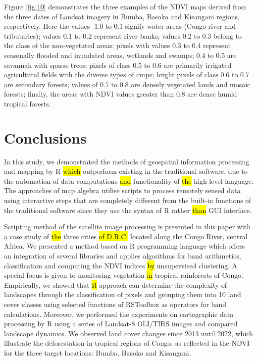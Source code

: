 \documentclass[applsci,article,submit,pdftex,moreauthors]{Definitions/mdpi}
\begin{document}
Figure \ref{fig:10} demonstrates the three examples of the NDVI maps derived from the three dates of Landsat imagery in Bumba, Basoko and Kisangani regions, respectively. Here the values -1.0 to 0.1 signify water areas (Congo river and tributaries); values 0.1 to 0.2 represent river banks; values 0.2 to 0.3 belong to the class of the non-vegetated areas; pixels with values 0.3 to 0.4 represent seasonally flooded and inundated areas, wetlands and swamps; 0.4 to 0.5 are savannah with sparse trees; pixels of class 0.5 to 0.6 are primarily irrigated agricultural fields with the diverse types of crops; bright pixels of class 0.6 to 0.7 are secondary forests; values of 0.7 to 0.8 are densely vegetated lands and mosaic forests; finally, the areas with NDVI values greater than 0.8 are dense humid tropical forests. 

\section{Conclusions}
In this study, we demonstrated\hl{ }the methods of geospatial information processing and mapping by R \hl{which} outperform\hl{ }existing in the traditional software, due to the automation of data \hl{ }computations \hl{and} functionality of \hl{the} high-level language. The approaches of map algebra utilise scripts to process remotely sensed data using interactive steps that are completely different from the built-in functions of the traditional software since they use the syntax of R rather \hl{than} GUI interface. 

Scripting method of the satellite image processing is presented in this paper with a\hl{} case study of \hl{the }three cities \hl{of D.R.C. }located along the Congo River, central Africa. We\hl{ }presented a method based on R programming language which offers an integration of\hl{ }several libraries and applies algorithms for band arithmetics, classification and computing the NDVI indices \hl{by} unsupervised clustering. A special focus is given to monitoring vegetation \hl{in} tropical rainforests of Congo. Empirically, we showed that \hl{R} approach can determine the complexity of landscapes through the classification of pixels and grouping them into 10 land cover classes using \hl{ }selected functions of RSToolbox as operators for band calculations. Moreover, we performed the experiments on cartographic data processing by R using a series of Landsat-8 OLI/TIRS images and compared landscape dynamics. We observed land cover changes since 2013 until 2022, which illustrate the deforestation in tropical regions of Congo, as reflected in the NDVI for the three target locations: Bumba, Basoko and Kisangani.
\end{document}
